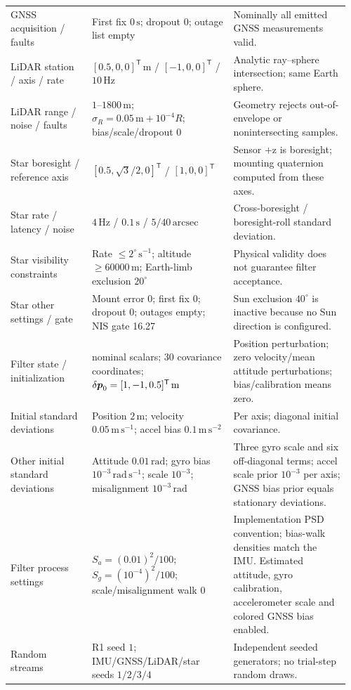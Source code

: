 \begin{longtable}{@{}>{\raggedright\arraybackslash}p{0.23\linewidth}>{\raggedright\arraybackslash}p{0.4\linewidth}>{\raggedright\arraybackslash}p{0.33\linewidth}@{}}
GNSS acquisition / faults & First fix $0\,\mathrm{s}$; dropout 0; outage list empty & Nominally all emitted GNSS measurements valid. \\
LiDAR station / axis / rate & $[0.5,0,0]^{\mathsf T}\,\mathrm{m}$ / $[-1,0,0]^{\mathsf T}$ / $10\,\mathrm{Hz}$ & Analytic ray--sphere intersection; same Earth sphere. \\
LiDAR range / noise / faults & $1$--$1800\,\mathrm{m}$; $\sigma_R=0.05\,\mathrm{m}+10^{-4}R$; bias/scale/dropout 0 & Geometry rejects out-of-envelope or nonintersecting samples. \\
Star boresight / reference axis & $[0.5,\sqrt3/2,0]^{\mathsf T}$ / $[1,0,0]^{\mathsf T}$ & Sensor +z is boresight; mounting quaternion computed from these axes. \\
Star rate / latency / noise & $4\,\mathrm{Hz}$ / $0.1\,\mathrm{s}$ / $5/40\,\mathrm{arcsec}$ & Cross-boresight / boresight-roll standard deviation. \\
Star visibility constraints & Rate $\le2^\circ\,\mathrm{s^{-1}}$; altitude $\ge60000\,\mathrm{m}$; Earth-limb exclusion $20^\circ$ & Physical validity does not guarantee filter acceptance. \\
Star other settings / gate & Mount error 0; first fix 0; dropout 0; outages empty; NIS gate 16.27 & Sun exclusion $40^\circ$ is inactive because no Sun direction is configured. \\
Filter state / initialization & 31 nominal scalars; 30 covariance coordinates; $\delta\boldsymbol{p}_0=[1,-1,0.5]^{\mathsf T}\,\mathrm{m}$ & Position perturbation; zero velocity/mean attitude perturbations; bias/calibration means zero. \\
Initial standard deviations & Position $2\,\mathrm{m}$; velocity $0.05\,\mathrm{m\,s^{-1}}$; accel bias $0.1\,\mathrm{m\,s^{-2}}$ & Per axis; diagonal initial covariance. \\
Other initial standard deviations & Attitude $0.01\,\mathrm{rad}$; gyro bias $10^{-3}\,\mathrm{rad\,s^{-1}}$; scale $10^{-3}$; misalignment $10^{-3}\,\mathrm{rad}$ & Three gyro scale and six off-diagonal terms; accel scale prior $10^{-3}$ per axis; GNSS bias prior equals stationary deviations. \\
Filter process settings & $S_a=(0.01)^2/100$; $S_g=(10^{-4})^2/100$; scale/misalignment walk 0 & Implementation PSD convention; bias-walk densities match the IMU. Estimated attitude, gyro calibration, accelerometer scale and colored GNSS bias enabled. \\
Random streams & R1 seed $1$; IMU/GNSS/LiDAR/star seeds $1/2/3/4$ & Independent seeded generators; no trial-step random draws. \\
\end{longtable}\endgroup

